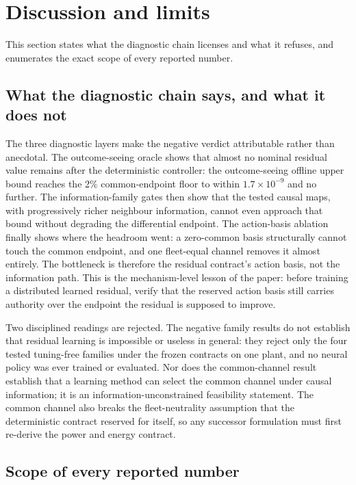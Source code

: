 \documentclass[journal]{IEEEtran}
\begin{document}
\section{Discussion and limits}
\label{sec:discussion}

This section states what the diagnostic chain licenses and what it refuses, and enumerates the exact scope of every reported number.

\subsection{What the diagnostic chain says, and what it does not}
\label{sec:what-it-says}

The three diagnostic layers make the negative verdict attributable rather than anecdotal. The outcome-seeing oracle shows that almost no nominal residual value remains after the deterministic controller: the outcome-seeing offline upper bound reaches the 2\% common-endpoint floor to within $1.7\times10^{-9}$ and no further. The information-family gates then show that the tested causal maps, with progressively richer neighbour information, cannot even approach that bound without degrading the differential endpoint. The action-basis ablation finally shows where the headroom went: a zero-common basis structurally cannot touch the common endpoint, and one fleet-equal channel removes it almost entirely. The bottleneck is therefore the residual contract's action basis, not the information path. This is the mechanism-level lesson of the paper: before training a distributed learned residual, verify that the reserved action basis still carries authority over the endpoint the residual is supposed to improve.

Two disciplined readings are rejected. The negative family results do not establish that residual learning is impossible or useless in general: they reject only the four tested tuning-free families under the frozen contracts on one plant, and no neural policy was ever trained or evaluated. Nor does the common-channel result establish that a learning method can select the common channel under causal information; it is an information-unconstrained feasibility statement. The common channel also breaks the fleet-neutrality assumption that the deterministic contract reserved for itself, so any successor formulation must first re-derive the power and energy contract.

\subsection{Scope of every reported number}
\label{sec:scope}
\end{document}
